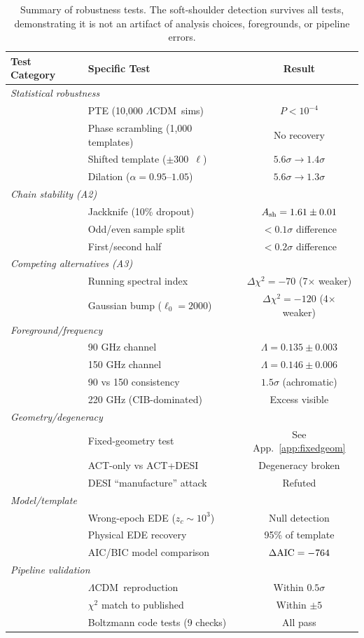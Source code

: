 \documentclass[onecolumn,showpacs,preprintnumbers,amsmath,amssymb,prd]{revtex4-2}
\newcommand{\lcdm}{$\Lambda$CDM}
\begin{document}
\begin{table}[t]
\centering
\caption{Summary of robustness tests. The soft-shoulder detection 
survives all tests, demonstrating it is not an artifact of analysis 
choices, foregrounds, or pipeline errors.}
\begin{tabular}{llc}
\toprule
Test Category & Specific Test & Result \\
\midrule
\multicolumn{3}{l}{\textit{Statistical robustness}} \\
& PTE (10,000 \lcdm\ sims) & $P < 10^{-4}$ \\
& Phase scrambling (1,000 templates) & No recovery \\
& Shifted template ($\pm 300$~$\ell$) & $5.6\sigma \to 1.4\sigma$ \\
& Dilation ($\alpha = 0.95$--$1.05$) & $5.6\sigma \to 1.3\sigma$ \\
\midrule
\multicolumn{3}{l}{\textit{Chain stability (A2)}} \\
& Jackknife (10\% dropout) & $A_{\rm sh} = 1.61 \pm 0.01$ \\
& Odd/even sample split & $< 0.1\sigma$ difference \\
& First/second half & $< 0.2\sigma$ difference \\
\midrule
\multicolumn{3}{l}{\textit{Competing alternatives (A3)}} \\
& Running spectral index & $\Delta\chi^2 = -70$ (7$\times$ weaker) \\
& Gaussian bump ($\ell_0 = 2000$) & $\Delta\chi^2 = -120$ (4$\times$ weaker) \\
\midrule
\multicolumn{3}{l}{\textit{Foreground/frequency}} \\
& 90 GHz channel & $\Lambda = 0.135 \pm 0.003$ \\
& 150 GHz channel & $\Lambda = 0.146 \pm 0.006$ \\
& 90 vs 150 consistency & $1.5\sigma$ (achromatic) \\
& 220 GHz (CIB-dominated) & Excess visible \\
\midrule
\multicolumn{3}{l}{\textit{Geometry/degeneracy}} \\
& Fixed-geometry test & See App.~\ref{app:fixedgeom} \\
& ACT-only vs ACT+DESI & Degeneracy broken \\
& DESI ``manufacture'' attack & Refuted \\
\midrule
\multicolumn{3}{l}{\textit{Model/template}} \\
& Wrong-epoch EDE ($z_c \sim 10^3$) & Null detection \\
& Physical EDE recovery & 95\% of template \\
& AIC/BIC model comparison & $\Delta\rm{AIC} = -764$ \\
\midrule
\multicolumn{3}{l}{\textit{Pipeline validation}} \\
& \lcdm\ reproduction & Within $0.5\sigma$ \\
& $\chi^2$ match to published & Within $\pm 5$ \\
& Boltzmann code tests (9 checks) & All pass \\
\bottomrule
\end{tabular}
\label{tab:robustness_summary}
\end{table}
\end{document}
